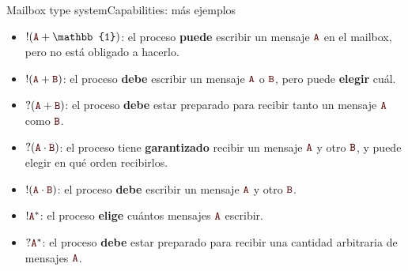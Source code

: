 \documentclass{beamer}
\newcommand{\msgtag}[1]{\texttt{\textcolor{msg-color}{#1}}}
\begin{document}
\begin{frame}{Mailbox type system}{Capabilities: más ejemplos}
    \vspace{1em}
    \begin{itemize}
        \item $!(\msgtag{A} + \mathbb{1})$: el proceso \textbf{puede} escribir un mensaje $\msgtag{A}$ en el mailbox, pero no está obligado a hacerlo.
        \item $!(\msgtag{A} + \msgtag{B})$: el proceso \textbf{debe} escribir un mensaje $\msgtag{A}$ o $\msgtag{B}$, pero puede \textbf{elegir} cuál.
        \item $?(\msgtag{A} + \msgtag{B})$: el proceso \textbf{debe} estar preparado para recibir tanto un mensaje $\msgtag{A}$ como $\msgtag{B}$.
        \item $?(\msgtag{A} \cdot \msgtag{B})$: el proceso tiene \textbf{garantizado} recibir un mensaje $\msgtag{A}$ y otro $\msgtag{B}$, y puede elegir en qué orden recibirlos.
        \item $!(\msgtag{A} \cdot \msgtag{B})$: el proceso \textbf{debe} escribir un mensaje $\msgtag{A}$ y otro $\msgtag{B}$.
        \item $!\msgtag{A}^\ast$: el proceso \textbf{elige} cuántos mensajes $\msgtag{A}$ escribir.
        \item $?\msgtag{A}^\ast$: el proceso \textbf{debe} estar preparado para recibir una cantidad arbitraria de mensajes $\msgtag{A}$.
    \end{itemize}
\end{frame}
\end{document}
